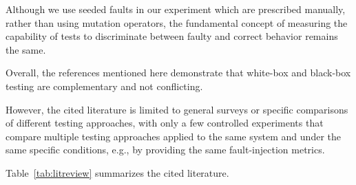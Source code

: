 \documentclass[conference]{IEEEtran}
\begin{document}
Although we use seeded faults in our experiment which are prescribed manually, rather than using mutation operators, the fundamental concept of measuring the capability of tests to discriminate between faulty and correct behavior remains the same.

Overall, the references mentioned here demonstrate that white-box and black-box testing are complementary and not conflicting.

However, the cited literature is limited to general surveys or specific comparisons of different testing approaches, with only a few controlled experiments that compare multiple testing approaches applied to the same system and under the same specific conditions, e.g., by providing the same fault-injection metrics.



Table~\ref{tab:litreview} summarizes the cited literature.
\end{document}
